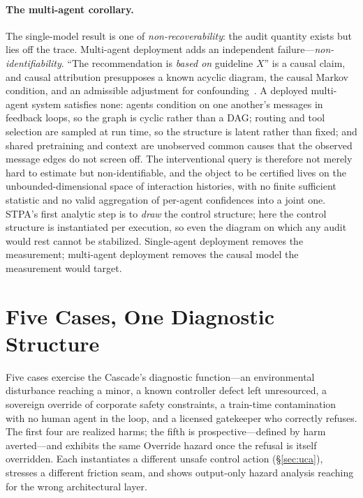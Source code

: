 \documentclass[11pt]{article}
\begin{document}
\paragraph{The multi-agent corollary.} The single-model result is one of \emph{non-recoverability}: the audit quantity exists but lies off the trace. Multi-agent deployment adds an independent failure---\emph{non-identifiability}. ``The recommendation is \emph{based on} guideline $X$'' is a causal claim, and causal attribution presupposes a known acyclic diagram, the causal Markov condition, and an admissible adjustment for confounding~\cite{pearl2009}. A deployed multi-agent system satisfies none: agents condition on one another's messages in feedback loops, so the graph is cyclic rather than a DAG; routing and tool selection are sampled at run time, so the structure is latent rather than fixed; and shared pretraining and context are unobserved common causes that the observed message edges do not screen off. The interventional query is therefore not merely hard to estimate but non-identifiable, and the object to be certified lives on the unbounded-dimensional space of interaction histories, with no finite sufficient statistic and no valid aggregation of per-agent confidences into a joint one. STPA's first analytic step is to \emph{draw} the control structure; here the control structure is instantiated per execution, so even the diagram on which any audit would rest cannot be stabilized. Single-agent deployment removes the measurement; multi-agent deployment removes the causal model the measurement would target.

\section{Five Cases, One Diagnostic Structure}\label{sec:cases}

Five cases exercise the Cascade's diagnostic function---an environmental disturbance reaching a minor, a known controller defect left unresourced, a sovereign override of corporate safety constraints, a train-time contamination with no human agent in the loop, and a licensed gatekeeper who correctly refuses. The first four are realized harms; the fifth is prospective---defined by harm averted---and exhibits the same Override hazard once the refusal is itself overridden. Each instantiates a different unsafe control action (\S\ref{sec:uca}), stresses a different friction seam, and shows output-only hazard analysis reaching for the wrong architectural layer.
\end{document}

